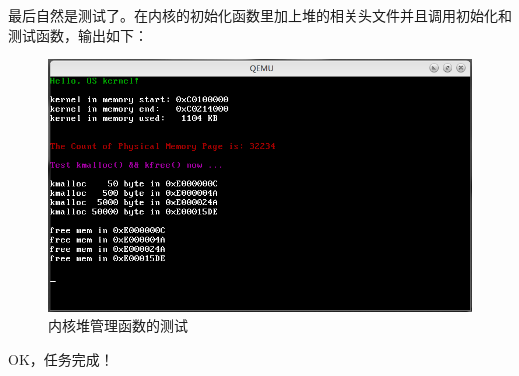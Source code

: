 \par 最后自然是测试了。在内核的初始化函数里加上堆的相关头文件并且调用初始化和测试函数，输出如下：

\begin{figure}[ht]
      \centering
      \includegraphics[scale=0.6]{picture/chapt11/HEAP_TEST.png}
      \caption{内核堆管理函数的测试}
\end{figure}

\par OK，任务完成！
